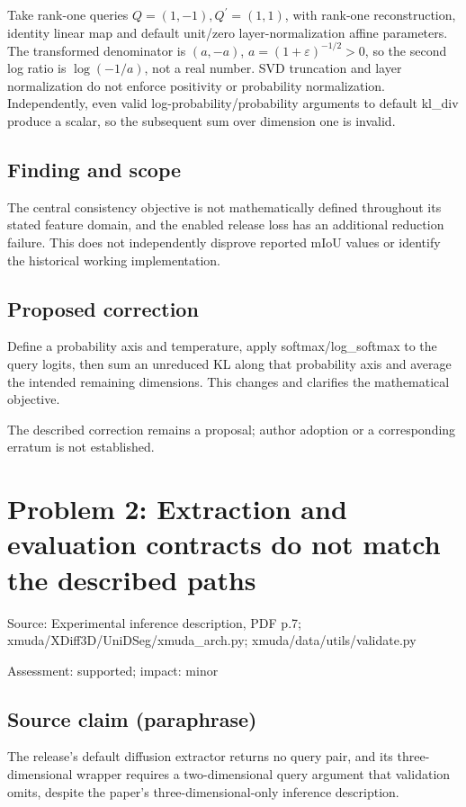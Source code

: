 \documentclass[11pt]{article}
\begin{document}
Take rank-one queries \(Q=(1,-1),Q^{\prime}=(1,1)\), with rank-one reconstruction, identity linear map and default unit/zero layer-normalization affine parameters. The transformed denominator is \((a,-a)\), \(a=(1+\varepsilon)^{-1/2}>0\), so the second log ratio is \(\log(-1/a)\), not a real number. SVD truncation and layer normalization do not enforce positivity or probability normalization. Independently, even valid log-probability/probability arguments to default kl\_div produce a scalar, so the subsequent sum over dimension one is invalid.

\subsection*{Finding and scope}

The central consistency objective is not mathematically defined throughout its stated feature domain, and the enabled release loss has an additional reduction failure. This does not independently disprove reported mIoU values or identify the historical working implementation.

\subsection*{Proposed correction}

Define a probability axis and temperature, apply softmax/log\_softmax to the query logits, then sum an unreduced KL along that probability axis and average the intended remaining dimensions. This changes and clarifies the mathematical objective.

The described correction remains a proposal; author adoption or a corresponding erratum is not established.

\section*{Problem 2: Extraction and evaluation contracts do not match the described paths}

Source: Experimental inference description, PDF p.7; xmuda/XDiff3D/UniDSeg/xmuda\_arch.py; xmuda/data/utils/validate.py

Assessment: supported; impact: minor

\subsection*{Source claim (paraphrase)}

The release’s default diffusion extractor returns no query pair, and its three-dimensional wrapper requires a two-dimensional query argument that validation omits, despite the paper’s three-dimensional-only inference description.
\end{document}
